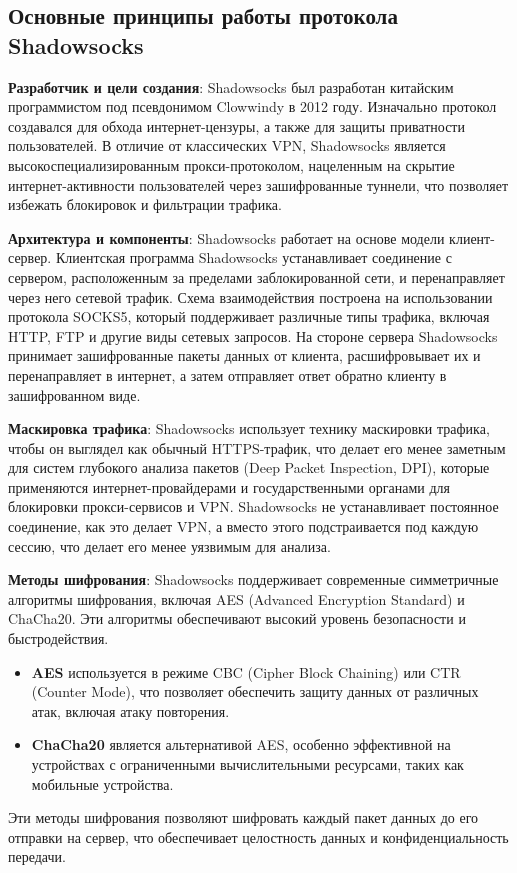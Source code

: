 \documentclass{SCWorks}
\begin{document}
\subsection{Основные принципы работы протокола Shadowsocks}

\textbf{Разработчик и цели создания}: Shadowsocks был разработан китайским программистом под псевдонимом Clowwindy в 2012 году. Изначально протокол создавался для обхода интернет-цензуры, а также для защиты приватности пользователей. В отличие от классических VPN, Shadowsocks является высокоспециализированным прокси-протоколом, нацеленным на скрытие интернет-активности пользователей через зашифрованные туннели, что позволяет избежать блокировок и фильтрации трафика.

\textbf{Архитектура и компоненты}: Shadowsocks работает на основе модели клиент-сервер. Клиентская программа Shadowsocks устанавливает соединение с сервером, расположенным за пределами заблокированной сети, и перенаправляет через него сетевой трафик. Схема взаимодействия построена на использовании протокола SOCKS5, который поддерживает различные типы трафика, включая HTTP, FTP и другие виды сетевых запросов. На стороне сервера Shadowsocks принимает зашифрованные пакеты данных от клиента, расшифровывает их и перенаправляет в интернет, а затем отправляет ответ обратно клиенту в зашифрованном виде.

\textbf{Маскировка трафика}: Shadowsocks использует технику маскировки трафика, чтобы он выглядел как обычный HTTPS-трафик, что делает его менее заметным для систем глубокого анализа пакетов (Deep Packet Inspection, DPI), которые применяются интернет-провайдерами и государственными органами для блокировки прокси-сервисов и VPN. Shadowsocks не устанавливает постоянное соединение, как это делает VPN, а вместо этого подстраивается под каждую сессию, что делает его менее уязвимым для анализа.

\textbf{Методы шифрования}: Shadowsocks поддерживает современные симметричные алгоритмы шифрования, включая AES (Advanced Encryption Standard) и ChaCha20. Эти алгоритмы обеспечивают высокий уровень безопасности и быстродействия. 
\begin{itemize}
    \item \textbf{AES} используется в режиме CBC (Cipher Block Chaining) или CTR (Counter Mode), что позволяет обеспечить защиту данных от различных атак, включая атаку повторения.
    \item \textbf{ChaCha20} является альтернативой AES, особенно эффективной на устройствах с ограниченными вычислительными ресурсами, таких как мобильные устройства.
\end{itemize}
Эти методы шифрования позволяют шифровать каждый пакет данных до его отправки на сервер, что обеспечивает целостность данных и конфиденциальность передачи.
\end{document}
